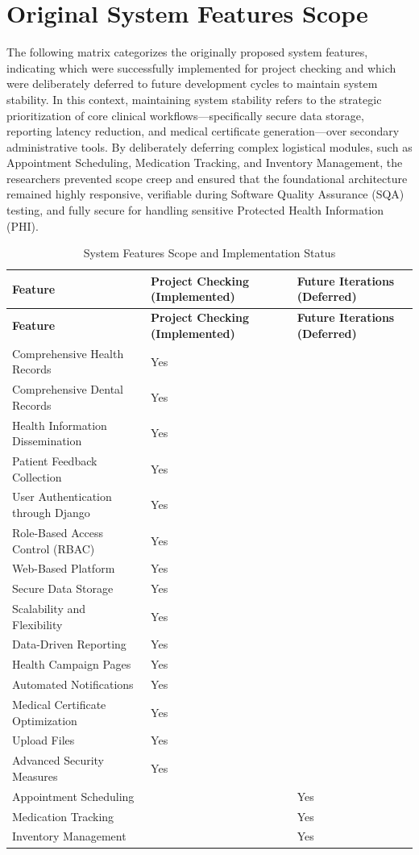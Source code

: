 \section{Original System Features Scope}
The following matrix categorizes the originally proposed system features, indicating which were successfully implemented for project checking and which were deliberately deferred to future development cycles to maintain system stability. In this context, maintaining system stability refers to the strategic prioritization of core clinical workflows---specifically secure data storage, reporting latency reduction, and medical certificate generation---over secondary administrative tools. By deliberately deferring complex logistical modules, such as Appointment Scheduling, Medication Tracking, and Inventory Management, the researchers prevented scope creep and ensured that the foundational architecture remained highly responsive, verifiable during Software Quality Assurance (SQA) testing, and fully secure for handling sensitive Protected Health Information (PHI).

\begin{longtable}{|p{}|p{}|p{}|}
\caption{System Features Scope and Implementation Status} \\
\hline
\textbf{Feature} & \centering \textbf{Project Checking (Implemented)} & \centering \textbf{Future Iterations (Deferred)} \tabularnewline
\hline
\endfirsthead
\hline
\textbf{Feature} & \centering \textbf{Project Checking (Implemented)} & \centering \textbf{Future Iterations (Deferred)} \tabularnewline
\hline
\endhead
\hline
\endfoot
Comprehensive Health Records & \centering Yes & \tabularnewline
\hline
Comprehensive Dental Records & \centering Yes & \tabularnewline
\hline
Health Information Dissemination & \centering Yes & \tabularnewline
\hline
Patient Feedback Collection & \centering Yes & \tabularnewline
\hline
User Authentication through Django & \centering Yes & \tabularnewline
\hline
Role-Based Access Control (RBAC) & \centering Yes & \tabularnewline
\hline
Web-Based Platform & \centering Yes & \tabularnewline
\hline
Secure Data Storage & \centering Yes & \tabularnewline
\hline
Scalability and Flexibility & \centering Yes & \tabularnewline
\hline
Data-Driven Reporting & \centering Yes & \tabularnewline
\hline
Health Campaign Pages & \centering Yes & \tabularnewline
\hline
Automated Notifications & \centering Yes & \tabularnewline
\hline
Medical Certificate Optimization & \centering Yes & \tabularnewline
\hline
Upload Files & \centering Yes & \tabularnewline
\hline
Advanced Security Measures & \centering Yes & \tabularnewline
\hline
Appointment Scheduling & & \centering Yes \tabularnewline
\hline
Medication Tracking & & \centering Yes \tabularnewline
\hline
Inventory Management & & \centering Yes \tabularnewline
\hline
\end{longtable}
